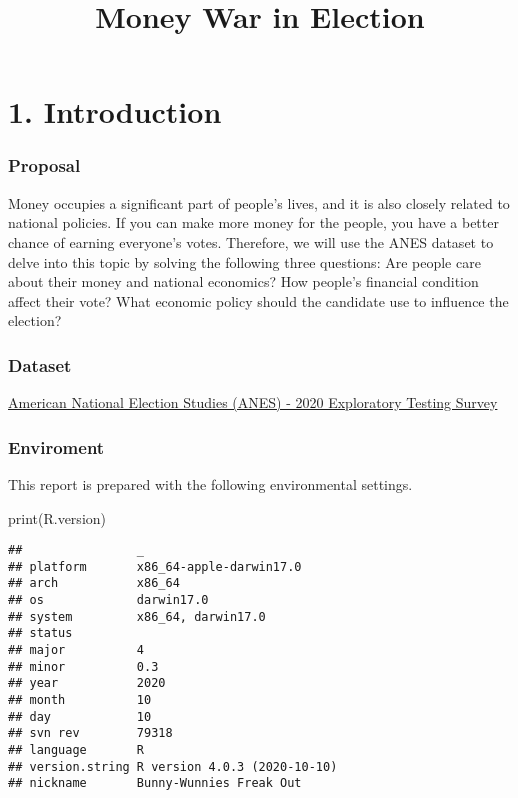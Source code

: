\documentclass[
]{article}
\title{Money War in Election}
\author{}
\date{\vspace{-2.5em}}
\newenvironment{Shaded}{\begin{snugshade}}{\end{snugshade}}
\newcommand{\FunctionTok}[1]{\textcolor[rgb]{0.00,0.00,0.00}{#1}}
\newcommand{\NormalTok}[1]{#1}
\begin{document}
\maketitle

\hypertarget{introduction}{%
\section{1. Introduction}\label{introduction}}

\hypertarget{proposal}{%
\subsubsection{Proposal}\label{proposal}}

Money occupies a significant part of people's lives, and it is also
closely related to national policies. If you can make more money for the
people, you have a better chance of earning everyone's votes. Therefore,
we will use the ANES dataset to delve into this topic by solving the
following three questions: Are people care about their money and
national economics? How people's financial condition affect their vote?
What economic policy should the candidate use to influence the election?

\hypertarget{dataset}{%
\subsubsection{Dataset}\label{dataset}}

\href{https://electionstudies.org/data-center/2020-exploratory-testing-survey/}{American
National Election Studies (ANES) - 2020 Exploratory Testing Survey}

\hypertarget{enviroment}{%
\subsubsection{Enviroment}\label{enviroment}}

This report is prepared with the following environmental settings.

\begin{Shaded}
\begin{Highlighting}[]
\FunctionTok{print}\NormalTok{(R.version)}
\end{Highlighting}
\end{Shaded}

\begin{verbatim}
##                _                           
## platform       x86_64-apple-darwin17.0     
## arch           x86_64                      
## os             darwin17.0                  
## system         x86_64, darwin17.0          
## status                                     
## major          4                           
## minor          0.3                         
## year           2020                        
## month          10                          
## day            10                          
## svn rev        79318                       
## language       R                           
## version.string R version 4.0.3 (2020-10-10)
## nickname       Bunny-Wunnies Freak Out
\end{verbatim}
\end{document}

